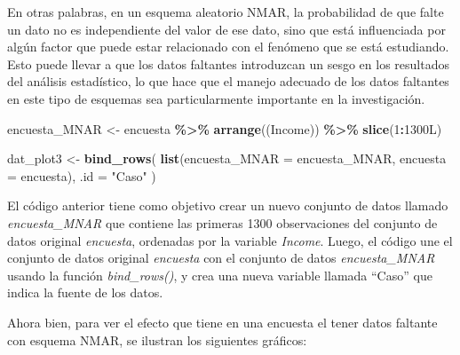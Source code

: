 \documentclass[
  spanish,
  12pt,
]{book}
\newenvironment{Shaded}{\begin{snugshade}}{\end{snugshade}}
\newcommand{\AttributeTok}[1]{\textcolor[rgb]{0.13,0.29,0.53}{#1}}
\newcommand{\DataTypeTok}[1]{\textcolor[rgb]{0.13,0.29,0.53}{#1}}
\newcommand{\DecValTok}[1]{\textcolor[rgb]{0.00,0.00,0.81}{#1}}
\newcommand{\FloatTok}[1]{\textcolor[rgb]{0.00,0.00,0.81}{#1}}
\newcommand{\FunctionTok}[1]{\textcolor[rgb]{0.13,0.29,0.53}{\textbf{#1}}}
\newcommand{\NormalTok}[1]{#1}
\newcommand{\OtherTok}[1]{\textcolor[rgb]{0.56,0.35,0.01}{#1}}
\newcommand{\SpecialCharTok}[1]{\textcolor[rgb]{0.81,0.36,0.00}{\textbf{#1}}}
\newcommand{\StringTok}[1]{\textcolor[rgb]{0.31,0.60,0.02}{#1}}
\begin{document}
En otras palabras, en un esquema aleatorio NMAR, la probabilidad de que falte un dato no es independiente del valor de ese dato, sino que está influenciada por algún factor que puede estar relacionado con el fenómeno que se está estudiando. Esto puede llevar a que los datos faltantes introduzcan un sesgo en los resultados del análisis estadístico, lo que hace que el manejo adecuado de los datos faltantes en este tipo de esquemas sea particularmente importante en la investigación.

\begin{Shaded}
\begin{Highlighting}[]
\NormalTok{encuesta\_MNAR }\OtherTok{\textless{}{-}}\NormalTok{ encuesta }\SpecialCharTok{\%\textgreater{}\%} 
  \FunctionTok{arrange}\NormalTok{((Income)) }\SpecialCharTok{\%\textgreater{}\%} 
  \FunctionTok{slice}\NormalTok{(}\DecValTok{1}\SpecialCharTok{:}\DecValTok{1300}\DataTypeTok{L}\NormalTok{)}

\NormalTok{dat\_plot3 }\OtherTok{\textless{}{-}} \FunctionTok{bind\_rows}\NormalTok{(}
  \FunctionTok{list}\NormalTok{(}\AttributeTok{encuesta\_MNAR =}\NormalTok{ encuesta\_MNAR,}
       \AttributeTok{encuesta =}\NormalTok{ encuesta), }\AttributeTok{.id =} \StringTok{"Caso"}\NormalTok{  )}
\end{Highlighting}
\end{Shaded}

El código anterior tiene como objetivo crear un nuevo conjunto de datos llamado \emph{encuesta\_MNAR} que contiene las primeras 1300 observaciones del conjunto de datos original \emph{encuesta}, ordenadas por la variable \emph{Income}. Luego, el código une el conjunto de datos original \emph{encuesta} con el conjunto de datos \emph{encuesta\_MNAR} usando la función \emph{bind\_rows()}, y crea una nueva variable llamada ``Caso'' que indica la fuente de los datos.

Ahora bien, para ver el efecto que tiene en una encuesta el tener datos faltante con esquema NMAR, se ilustran los siguientes gráficos:

\begin{Shaded}
\end{Shaded}
\end{document}
